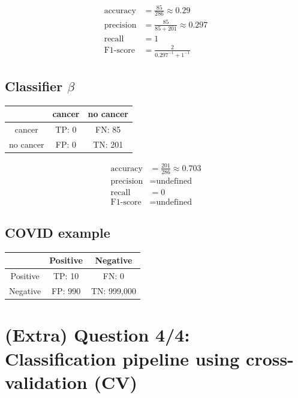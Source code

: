 \documentclass[12pt,a4paper]{article}
\begin{document}
\begin{align*}
  \text{accuracy}  & = \frac{85}{286} \approx 0.29     \\
  \text{precision} & = \frac{85}{85+201} \approx 0.297 \\
  \text{recall}    & = 1                               \\
  \text{F1-score}  & = \frac{2}{0.297^{-1}+1^{-1}}
\end{align*}

\subsection*{Classifier $\beta$}
\begin{table}[H]
  \centering
  \begin{tabular}{ccc}
    \toprule
              & cancer & no cancer \\
    \midrule
    cancer    & TP: 0  & FN: 85    \\
    no cancer & FP: 0  & TN: 201   \\
    \bottomrule
  \end{tabular}
\end{table}

\begin{align*}
  \text{accuracy}  & = \frac{201}{286} \approx 0.703 \\
  \text{precision} & = \text{undefined}              \\
  \text{recall}    & = 0                             \\
  \text{F1-score}  & = \text{undefined}
\end{align*}

\subsection*{COVID example}
\begin{table}[H]
  \centering
  \begin{tabular}{ccc}
    \toprule
             & Positive & Negative    \\
    \midrule
    Positive & TP: 10   & FN: 0       \\
    Negative & FP: 990  & TN: 999,000 \\
    \bottomrule
  \end{tabular}
\end{table}

\section*{(Extra) Question 4/4: Classification pipeline using cross-validation (CV)}
\end{document}
